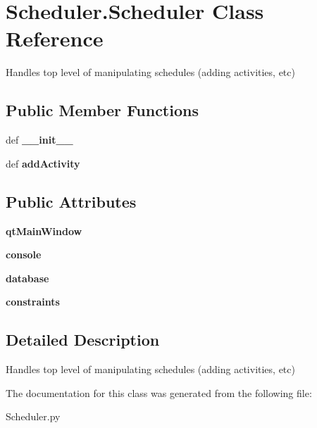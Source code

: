 \hypertarget{classScheduler_1_1Scheduler}{\section{Scheduler.\-Scheduler Class Reference}
\label{classScheduler_1_1Scheduler}
}


Handles top level of manipulating schedules (adding activities, etc)  


\subsection*{Public Member Functions}
\begin{DoxyCompactItemize}
\item 
\hypertarget{classScheduler_1_1Scheduler_a4fe53057fd9abcf7be5accf58d8d8581}{def {\bfseries \-\_\-\-\_\-init\-\_\-\-\_\-}}\label{classScheduler_1_1Scheduler_a4fe53057fd9abcf7be5accf58d8d8581}

\item 
\hypertarget{classScheduler_1_1Scheduler_a564dfa584d5369be1bb95263fdf01227}{def {\bfseries add\-Activity}}\label{classScheduler_1_1Scheduler_a564dfa584d5369be1bb95263fdf01227}

\end{DoxyCompactItemize}
\subsection*{Public Attributes}
\begin{DoxyCompactItemize}
\item 
\hypertarget{classScheduler_1_1Scheduler_a3195eae6797c4d4fbdda1c70d7fbdde5}{{\bfseries qt\-Main\-Window}}\label{classScheduler_1_1Scheduler_a3195eae6797c4d4fbdda1c70d7fbdde5}

\item 
\hypertarget{classScheduler_1_1Scheduler_afb572141c16b677dbd4665907c59fc25}{{\bfseries console}}\label{classScheduler_1_1Scheduler_afb572141c16b677dbd4665907c59fc25}

\item 
\hypertarget{classScheduler_1_1Scheduler_a386637a091ac39683ba009a19be08b80}{{\bfseries database}}\label{classScheduler_1_1Scheduler_a386637a091ac39683ba009a19be08b80}

\item 
\hypertarget{classScheduler_1_1Scheduler_a4406548dfef2709fd5803c7fc9daa8ac}{{\bfseries constraints}}\label{classScheduler_1_1Scheduler_a4406548dfef2709fd5803c7fc9daa8ac}

\end{DoxyCompactItemize}


\subsection{Detailed Description}
Handles top level of manipulating schedules (adding activities, etc) 

The documentation for this class was generated from the following file\-:\begin{DoxyCompactItemize}
\item 
Scheduler.\-py\end{DoxyCompactItemize}

